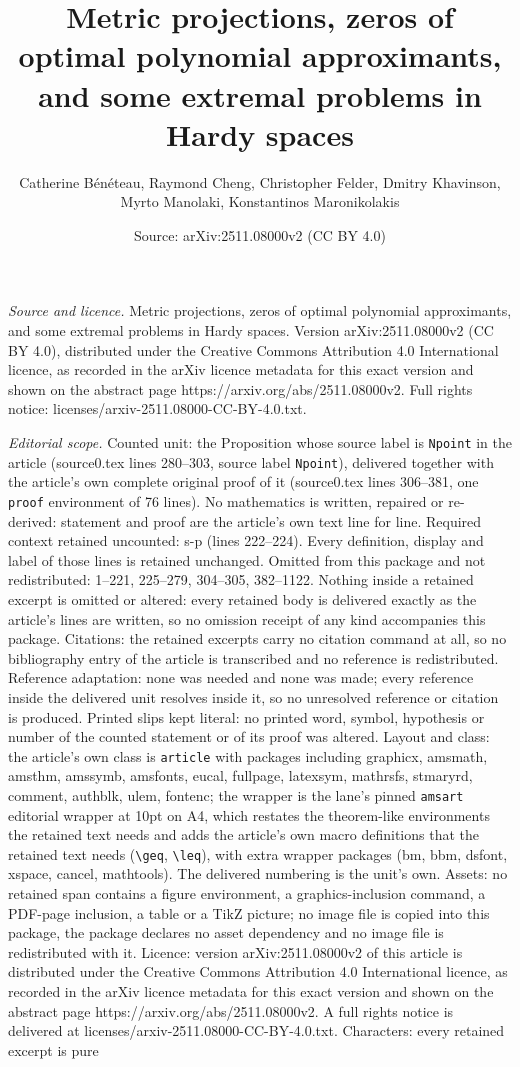 \documentclass[10pt,a4paper]{amsart}
\title[Metric projections, zeros of optimal polynomial approximants]{Metric projections, zeros of optimal polynomial approximants, and some extremal problems in Hardy spaces}
\author{Catherine B\'en\'eteau, Raymond Cheng, Christopher Felder, Dmitry Khavinson, Myrto Manolaki, Konstantinos Maronikolakis}
\date{Source: arXiv:2511.08000v2 (CC BY 4.0)}
\begin{document}
\maketitle

\noindent\emph{Source and licence.} Metric projections, zeros of optimal polynomial approximants, and some extremal problems in Hardy spaces. Version arXiv:2511.08000v2 (CC BY 4.0), distributed under the Creative Commons Attribution 4.0 International licence, as recorded in the arXiv licence metadata for this exact version and shown on the abstract page https://arxiv.org/abs/2511.08000v2. Full rights notice: licenses/arxiv-2511.08000-CC-BY-4.0.txt.\par\smallskip

\noindent\textit{Editorial scope.} Counted unit: the Proposition whose source label is \texttt{Npoint} in the article (source0.tex lines 280--303, source label \texttt{Npoint}), delivered together with the article's own complete original proof of it (source0.tex lines 306--381, one \texttt{proof} environment of 76 lines). No mathematics is written, repaired or re-derived: statement and proof are the article's own text line for line. Required context retained uncounted: s-p (lines 222--224). Every definition, display and label of those lines is retained unchanged. Omitted from this package and not redistributed: 1--221, 225--279, 304--305, 382--1122. Nothing inside a retained excerpt is omitted or altered: every retained body is delivered exactly as the article's lines are written, so no omission receipt of any kind accompanies this package. Citations: the retained excerpts carry no citation command at all, so no bibliography entry of the article is transcribed and no reference is redistributed. Reference adaptation: none was needed and none was made; every reference inside the delivered unit resolves inside it, so no unresolved reference or citation is produced. Printed slips kept literal: no printed word, symbol, hypothesis or number of the counted statement or of its proof was altered. Layout and class: the article's own class is \texttt{article} with packages including graphicx, amsmath, amsthm, amssymb, amsfonts, eucal, fullpage, latexsym, mathrsfs, stmaryrd, comment, authblk, ulem, fontenc; the wrapper is the lane's pinned \texttt{amsart} editorial wrapper at 10pt on A4, which restates the theorem-like environments the retained text needs and adds the article's own macro definitions that the retained text needs (\texttt{\textbackslash geq}, \texttt{\textbackslash leq}), with extra wrapper packages (bm, bbm, dsfont, xspace, cancel, mathtools). The delivered numbering is the unit's own. Assets: no retained span contains a figure environment, a graphics-inclusion command, a PDF-page inclusion, a table or a TikZ picture; no image file is copied into this package, the package declares no asset dependency and no image file is redistributed with it. Licence: version arXiv:2511.08000v2 of this article is distributed under the Creative Commons Attribution 4.0 International licence, as recorded in the arXiv licence metadata for this exact version and shown on the abstract page https://arxiv.org/abs/2511.08000v2. A full rights notice is delivered at licenses/arxiv-2511.08000-CC-BY-4.0.txt. Characters: every retained excerpt is pure 
\end{document}
